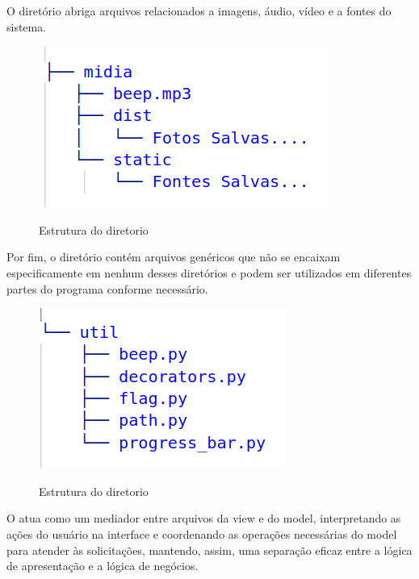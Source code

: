 O diretório  abriga arquivos relacionados a imagens, áudio, vídeo e a fontes do sistema. 
\begin{figure}[H]
	\centering
	\caption{Estrutura do diretorio }
	\includegraphics[scale=0.5]{figuras/diretorios/midia.png}
	\label{fig:midia}
\end{figure}

Por fim, o diretório  contém arquivos genéricos que não se encaixam especificamente em nenhum desses diretórios e podem ser utilizados em diferentes partes do programa conforme necessário.

\begin{figure}[H]
	\centering
    \caption{Estrutura do diretorio }
	\includegraphics[scale=0.5]{figuras/diretorios/util.png}
	\label{fig:util}
\end{figure}



O  atua como um mediador entre arquivos da view e do model, interpretando as ações do usuário na interface e coordenando as operações necessárias do model para atender às solicitações, mantendo, assim, uma separação eficaz entre a lógica de apresentação e a lógica de negócios.

